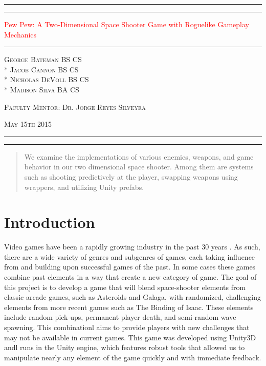 \documentclass[12pt]{article}       %
\def\hs{\hspace{15pt}}
\newcommand*{\titleAT}{\begingroup %
\newlength{\drop} %
\drop=0.1\textheight %

\rule{\textwidth}{1pt}\par %
\vspace{2pt}\vspace{-\baselineskip} %
\rule{\textwidth}{0.4pt}\par %

\vspace{\drop} %
\centering %
\textcolor{Red}{ %
{\Huge Pew Pew: A Two-Dimensional Space Shooter Game with Roguelike Gameplay Mechanics}\\[0.5\baselineskip] %
{\Huge }} %

\vspace{0.25\drop} %
\rule{0.3\textwidth}{0.4pt}\par %
\vspace{\drop} %

{\Large \textsc{George Bateman BS CS \\* Jacob Cannon BS CS \\* Nicholas DeVoll BS CS \\* \vspace{3pt} Madison Silva BA CS}}\par %

\vfill %

{\large \textsc{Faculty Mentor: Dr. Jorge Reyes Silveyra}}\par 

{\large \textsc{May 15th 2015}}\par

\vspace*{\drop} %

\rule{\textwidth}{0.4pt}\par %
\vspace{2pt}\vspace{-\baselineskip} %
\rule{\textwidth}{1pt}\par %

\endgroup}
\begin{document}
\begin{titlepage}
\thispagestyle{empty}
\titleAT
\end{titlepage}

\newpage
\begin{titlepage}
\thispagestyle{empty}
\tableofcontents
\end{titlepage}

\begin{titlepage}
\thispagestyle{empty}
\listoffigures
\end{titlepage}


\newpage

\begin{abstract} We examine the implementations of various enemies, weapons, and game behavior in our two dimensional space shooter. Among them are systems such as shooting predictively at the player, swapping weapons using wrappers, and utilizing Unity prefabs.
\end{abstract}

\section{Introduction} %
\label{sec:intro}

\hs Video games have been a rapidly growing industry in the past 30 years \cite{History}. As such, there are a wide variety of genres and subgenres of games, each taking influence from and building upon successful games of the past. In some cases these games combine past elements in a way that create a new category of game. The goal of this project is to develop a game that will blend space-shooter elements from classic arcade games, such as Asteroids and Galaga, with randomized, challenging elements from more recent games such as The Binding of Isaac. These elements include random pick-ups, permanent player death, and semi-random wave spawning. This combinationl aims to provide players with new challenges that may not be available in current games. This game was developed using Unity3D andl runs in the Unity engine, which features robust tools that allowed us to manipulate nearly any element of the game quickly and with immediate feedback.
\end{document}
